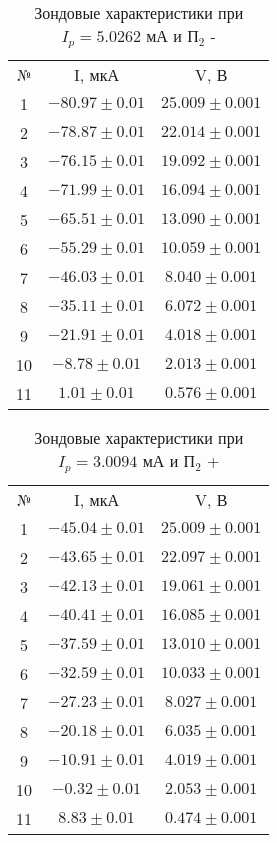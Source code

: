 \documentclass[a4paper]{article}
\begin{document}
        \begin{table}[h]
    \centering
        \begin{tabular}{|c|c|c|}
        \cline{1-3}
        № & I, мкА& V, В\\ \cline{1-3}
        1 & $-80.97\pm 0.01$& $25.009 \pm 0.001$\\ \cline{1-3}
        2 & $-78.87\pm 0.01$& $22.014 \pm 0.001$\\ \cline{1-3}
        3 & $-76.15\pm 0.01$& $19.092 \pm 0.001$\\ \cline{1-3}
        4 & $-71.99\pm 0.01$& $16.094 \pm 0.001$\\ \cline{1-3}
        5 & $-65.51\pm 0.01$& $13.090 \pm 0.001$\\ \cline{1-3}
        6 & $-55.29\pm 0.01$& $10.059 \pm 0.001$\\ \cline{1-3}
        7 & $-46.03\pm 0.01$& $8.040 \pm 0.001$\\ \cline{1-3}
        8 & $-35.11\pm 0.01$& $6.072 \pm 0.001$\\ \cline{1-3}
        9 & $-21.91\pm 0.01$& $4.018 \pm 0.001$\\ \cline{1-3}
        10 & $-8.78\pm 0.01$& $2.013 \pm 0.001$\\ \cline{1-3}
        11 & $1.01\pm 0.01$& $0.576 \pm 0.001$\\ \cline{1-3}
        \end{tabular}
        \caption{Зондовые характеристики при $I_p = 5.0262$ мА и $\text{П}_2$ -}
        \label{tab:my_label}
    \end{table}

        \begin{table}[h]
    \centering
        \begin{tabular}{|c|c|c|}
        \cline{1-3}
        № & I, мкА& V, В\\ \cline{1-3}
        1 & $-45.04\pm 0.01$& $25.009 \pm 0.001$\\ \cline{1-3}
        2 & $-43.65\pm 0.01$& $22.097 \pm 0.001$\\ \cline{1-3}
        3 & $-42.13\pm 0.01$& $19.061 \pm 0.001$\\ \cline{1-3}
        4 & $-40.41\pm 0.01$& $16.085 \pm 0.001$\\ \cline{1-3}
        5 & $-37.59\pm 0.01$& $13.010 \pm 0.001$\\ \cline{1-3}
        6 & $-32.59\pm 0.01$& $10.033 \pm 0.001$\\ \cline{1-3}
        7 & $-27.23\pm 0.01$& $8.027 \pm 0.001$\\ \cline{1-3}
        8 & $-20.18\pm 0.01$& $6.035 \pm 0.001$\\ \cline{1-3}
        9 & $-10.91\pm 0.01$& $4.019 \pm 0.001$\\ \cline{1-3}
        10 & $-0.32\pm 0.01$& $2.053 \pm 0.001$\\ \cline{1-3}
        11 & $8.83\pm 0.01$& $0.474 \pm 0.001$\\ \cline{1-3}
        \end{tabular}
        \caption{Зондовые характеристики при $I_p = 3.0094$ мА и $\text{П}_2$ +}
        \label{tab:my_label}
    \end{table}
\end{document}
